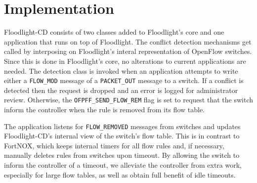 \section{Implementation}
\label{sec:implementation}

Floodlight-CD consists of two classes added to Floodlight's core and one application that runs on top of Floodlight.
The conflict detection mechanisms get called by interposing on Floodlight's interal representation of OpenFlow switches.
Since this is done in Floodlight's core, no alterations to current applications are needed.
The detection class is invoked when an application attempts to write either a \texttt{FLOW_MOD} message of a \texttt{PACKET_OUT} message to a switch.
If a conflict is detected then the request is dropped and an error is logged for administrator review.
Otherwise, the \texttt{OFPFF_SEND_FLOW_REM} flag is set to request that the switch inform the controller when the rule is removed from its flow table.

The application listens for \texttt{FLOW_REMOVED} messages from switches and updates Floodlight-CD's internal view of the switch's flow table.
This is in contrast to FortNOX, which keeps internal timers for all flow rules and, if necessary, manually deletes rules from switches upon timeout.
By allowing the switch to inform the controller of a timeout, we alleviate the controller from extra work, especially for large flow tables, as well as obtain full benefit of idle timeouts.

